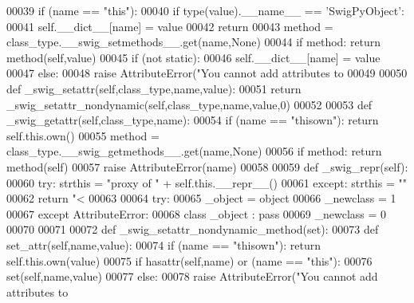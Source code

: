 \begin{DoxyCode}
00039     \textcolor{keywordflow}{if} (name == \textcolor{stringliteral}{"this"}):
00040         \textcolor{keywordflow}{if} type(value).\_\_name\_\_ == \textcolor{stringliteral}{'SwigPyObject'}:
00041             self.\_\_dict\_\_[name] = value
00042             \textcolor{keywordflow}{return}
00043     method = class\_type.\_\_swig\_setmethods\_\_.get(name,\textcolor{keywordtype}{None})
00044     \textcolor{keywordflow}{if} method: \textcolor{keywordflow}{return} method(self,value)
00045     \textcolor{keywordflow}{if} (\textcolor{keywordflow}{not} static):
00046         self.\_\_dict\_\_[name] = value
00047     \textcolor{keywordflow}{else}:
00048         \textcolor{keywordflow}{raise} AttributeError(\textcolor{stringliteral}{"You cannot add attributes to %
00049 
00050 \textcolor{keyword}{def }_swig_setattr(self,class\_type,name,value):
00051     \textcolor{keywordflow}{return} _swig_setattr_nondynamic(self,class\_type,name,value,0)
00052 
00053 \textcolor{keyword}{def }_swig_getattr(self,class\_type,name):
00054     \textcolor{keywordflow}{if} (name == \textcolor{stringliteral}{"thisown"}): \textcolor{keywordflow}{return} self.this.own()
00055     method = class\_type.\_\_swig\_getmethods\_\_.get(name,\textcolor{keywordtype}{None})
00056     \textcolor{keywordflow}{if} method: \textcolor{keywordflow}{return} method(self)
00057     \textcolor{keywordflow}{raise} AttributeError(name)
00058 
00059 \textcolor{keyword}{def }_swig_repr(self):
00060     \textcolor{keywordflow}{try}: strthis = \textcolor{stringliteral}{"proxy of "} + self.this.\_\_repr\_\_()
00061     \textcolor{keywordflow}{except}: strthis = \textcolor{stringliteral}{""}
00062     \textcolor{keywordflow}{return} \textcolor{stringliteral}{"<%
00063 
00064 \textcolor{keywordflow}{try}:
00065     \_object = object
00066     \_newclass = 1
00067 \textcolor{keywordflow}{except} AttributeError:
00068     \textcolor{keyword}{class }_object : \textcolor{keyword}{pass}
00069     \_newclass = 0
00070 
00071 
00072 \textcolor{keyword}{def }_swig_setattr_nondynamic_method(set):
00073     \textcolor{keyword}{def }set\_attr(self,name,value):
00074         \textcolor{keywordflow}{if} (name == \textcolor{stringliteral}{"thisown"}): \textcolor{keywordflow}{return} self.this.own(value)
00075         \textcolor{keywordflow}{if} hasattr(self,name) \textcolor{keywordflow}{or} (name == \textcolor{stringliteral}{"this"}):
00076             set(self,name,value)
00077         \textcolor{keywordflow}{else}:
00078             \textcolor{keywordflow}{raise} AttributeError(\textcolor{stringliteral}{"You cannot add attributes to %
}}}
\end{DoxyCode}

